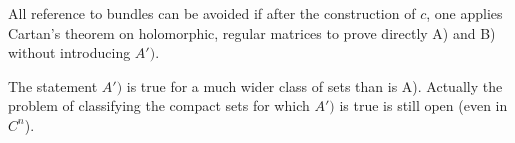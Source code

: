 \begin{remark*}
All reference to bundles can be avoided if after the construction  of
$c$, one applies Cartan's theorem on holomorphic, regular matrices to
prove directly A) and B) without introducing $A')$.

The statement $A')$ is true for a much wider class of sets than is
A). Actually the problem of classifying the compact sets for which
$A')$ is true is still open (even in $C^n$). 
\end{remark*}
